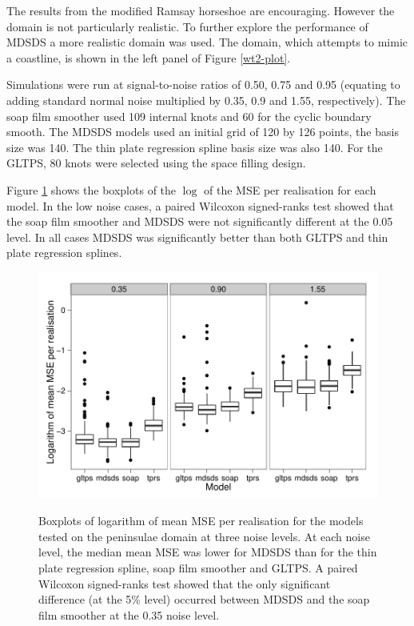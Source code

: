 \documentclass[smallextended]{svjour3}       %
\begin{document}
The results from the modified Ramsay horseshoe are encouraging. However the domain is not particularly realistic. To further explore the performance of MDSDS a more realistic domain was used. The domain, which attempts to mimic a coastline, is shown in the left panel of Figure \ref{wt2-plot}.

Simulations were run at signal-to-noise ratios of 0.50, 0.75 and 0.95 (equating to adding standard normal noise multiplied by 0.35, 0.9 and 1.55, respectively). The soap film smoother used 109 internal knots and 60 for the cyclic boundary smooth. The MDSDS models used an initial grid of 120 by 126 points, the basis size was 140. The thin plate regression spline basis size was also 140. For the GLTPS, 80 knots were selected using the space filling design.

Figure \ref{wt2-boxplots} shows the boxplots of the $\log$ of the MSE per realisation for each model. In the low noise cases, a paired Wilcoxon signed-ranks test showed that the soap film smoother and MDSDS were not significantly different at the 0.05 level. In all cases MDSDS was significantly better than both GLTPS and thin plate regression splines.


\begin{figure}
\centering
\includegraphics[width=\textwidth]{examples/wt2/wt2-result.pdf} \\
\caption{Boxplots of logarithm of mean MSE per realisation for the models tested on the peninsulae domain at three noise levels. At each noise level, the median mean MSE was lower for MDSDS than for the thin plate regression spline, soap film smoother and GLTPS. A paired Wilcoxon signed-ranks test showed that the only significant difference (at the 5\% level) occurred between MDSDS and the soap film smoother at the 0.35 noise level.}
\label{wt2-boxplots}
\end{figure}
\end{document}
